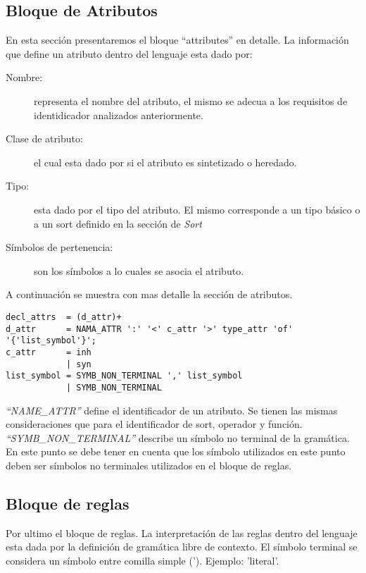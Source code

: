 \subsection{Bloque de Atributos}
En esta sección presentaremos el bloque ``attributes'' en detalle. La información que define un atributo dentro del lenguaje esta dado por: 
\begin{description}
\item [Nombre:] representa el nombre del atributo, el mismo se adecua a los requisitos de identidicador analizados anteriormente.
\item [Clase de atributo:] el cual esta dado por si el atributo es sintetizado o heredado.
\item [Tipo:] esta dado por el tipo del atributo. El mismo corresponde a un tipo básico o a un sort definido en la sección de \textit{Sort}
\item [Símbolos de pertenencia:] son los símbolos a lo cuales se asocia el atributo.
\end{description}
A continuación se muestra con mas detalle la sección de atributos.
\begin{center}
\lstset{language=inform}
\tiny
\begin{lstlisting}[frame=single]
decl_attrs  = (d_attr)+ 
d_attr      = NAMA_ATTR ':' '<' c_attr '>' type_attr 'of' '{'list_symbol'}';
c_attr      = inh
            | syn
list_symbol = SYMB_NON_TERMINAL ',' list_symbol
            | SYMB_NON_TERMINAL 
\end{lstlisting}
\end{center}
\textit{``NAME\_ATTR''} define el identificador de un atributo. Se tienen las mismas consideraciones que para el identificador de sort, operador y función. \textit{``SYMB\_NON\_TERMINAL''} describe un símbolo no terminal de la gramática. En este punto se debe tener en cuenta que los símbolo utilizados en este punto deben ser símbolos no terminales utilizados en el bloque de reglas.
\subsection{Bloque de reglas}
Por ultimo el bloque de reglas. La interpretación de las reglas dentro del lenguaje esta dada por la definición de gramática libre de contexto.          El símbolo terminal se considera un símbolo entre comilla simple ('). Ejemplo: 'literal'. 

